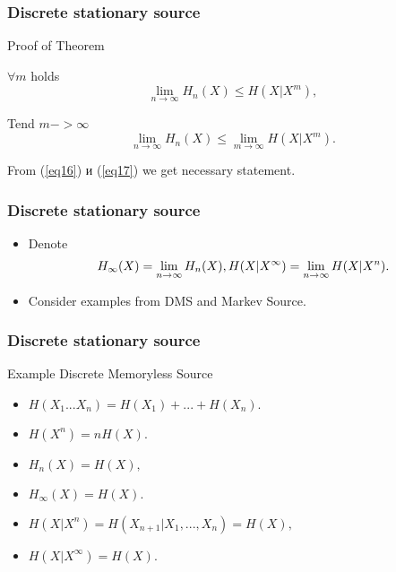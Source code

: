\documentclass[14pt]{beamer}
\begin{document}
\begin{frame}
\frametitle{Discrete stationary source}
Proof of Theorem
\begin{itemize}
\small{

    \item $\forall m$ holds 
    \[
    \mathop {\lim }\limits_{n \to \infty } H_n (X) \le H(X\vert X^m),
    \]
    
    \item Tend $m -> \infty$ 
    \begin{equation}
    \label{eq17}
    \mathop {\lim }\limits_{n \to \infty } H_n (X) \le \mathop {\lim }\limits_{m
    \to \infty } H(X\vert X^m).
    \end{equation}
    
    \from From (\ref{eq16}) и (\ref{eq17}) we get necessary statement.
}
\end{itemize}
\end{frame}


\begin{frame}
\frametitle{Discrete stationary source}
\begin{itemize}

    \item Denote
    \[
    H_\infty (X) = \mathop {\lim }\limits_{n \to \infty } H_n (X),
    \\
    H(X\vert X^\infty ) = \mathop {\lim }\limits_{n \to \infty } H(X\vert X^n).
    \]

    \item Consider examples from DMS and Markev Source.

\end{itemize}
\end{frame}




\begin{frame}
\frametitle{Discrete stationary source}
Example Discrete Memoryless Source
\begin{itemize}
    \item 
    $H(X_1 ...X_n ) = H(X_1 ) + ... + H(X_n ).$
    
    \item 
    $H(X^n) = nH(X).$

    \item 
    $H_n (X) = H(X),$
    
    \item 
    $H_\infty (X) = H(X).$
    
    \item
    $H(X\vert X^n) = H(X_{n + 1} \vert X_1 ,...,X_n ) = H(X),$
    
    \item 
    $H(X\vert X^\infty ) = H(X).$  
\end{itemize}
\end{frame}
\end{document}
